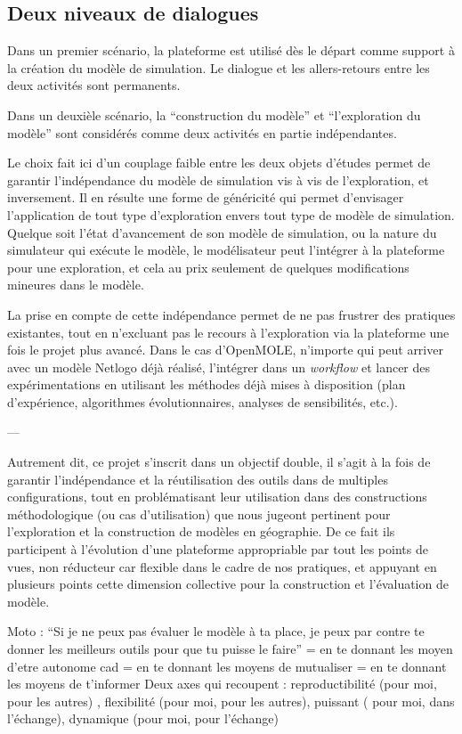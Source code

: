 \subsection{Deux niveaux de dialogues}

Dans un premier scénario, la plateforme est utilisé dès le départ comme support à la création du modèle de simulation. Le dialogue et les allers-retours entre les deux activités sont permanents.

Dans un deuxièle scénario, la \enquote{construction du modèle} et \enquote{l'exploration du modèle} sont considérés comme deux activités en partie indépendantes.

Le choix fait ici d'un couplage faible entre les deux objets d'études permet de garantir l'indépendance du modèle de simulation vis à vis de l'exploration, et inversement. Il en résulte une forme de généricité qui permet d'envisager l'application de tout type d'exploration envers tout type de modèle de simulation. Quelque soit l'état d'avancement de son modèle de simulation, ou la nature du simulateur qui exécute le modèle, le modélisateur peut l'intégrer à la plateforme pour une exploration, et cela au prix seulement de quelques modifications mineures dans le modèle.

La prise en compte de cette indépendance permet de ne pas frustrer des pratiques existantes, tout en n'excluant pas le recours à l'exploration via la plateforme une fois le projet plus avancé. Dans le cas d'OpenMOLE, n'importe qui peut arriver avec un modèle Netlogo déjà réalisé, l'intégrer dans un \textit{workflow} et lancer des expérimentations en utilisant les méthodes déjà mises à disposition (plan d'expérience, algorithmes évolutionnaires, analyses de sensibilités, etc.).


---


Autrement dit, ce projet s'inscrit dans un objectif double, il s'agit à la fois de garantir l'indépendance et la réutilisation des outils dans de multiples configurations, tout en problématisant leur utilisation dans des constructions méthodologique (ou cas d'utilisation) que nous jugeont pertinent pour l'exploration et la construction de modèles en géographie. De ce fait ils participent à l'évolution d'une plateforme appropriable par tout les points de vues, non réducteur car flexible dans le cadre de nos pratiques, et appuyant en plusieurs points cette dimension collective pour la construction et l'évaluation de modèle.

Moto : \enquote{Si je ne peux pas évaluer le modèle à ta place, je peux par contre te donner les meilleurs outils pour que tu puisse le faire} 
= en te donnant les moyen d'etre autonome cad
= en te donnant les moyens de mutualiser
= en te donnant les moyens de t'informer 
Deux axes qui recoupent : reproductibilité (pour moi, pour les autres) , flexibilité (pour moi, pour les autres), puissant ( pour moi, dans l'échange), dynamique (pour moi, pour l'échange)

